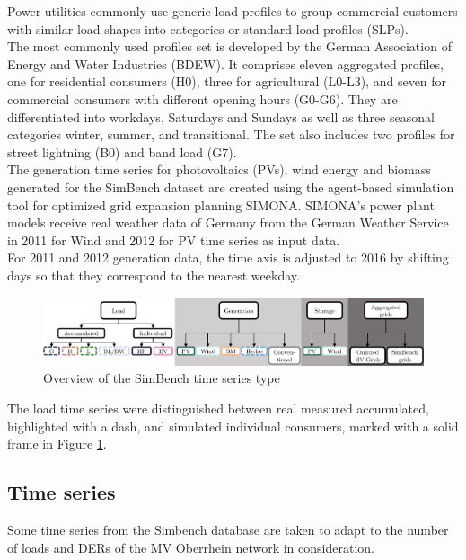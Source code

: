 Power utilities commonly use generic load profiles to group commercial customers with similar load shapes into categories or standard load profiles (\glspl{SLP}). \\
The most commonly used profiles set is developed by the German Association of Energy and Water Industries (\gls{BDEW}). It comprises eleven aggregated profiles, one for residential consumers (H0), three for agricultural (L0-L3), and seven for commercial consumers with different opening hours (G0-G6). They are differentiated into workdays, Saturdays and Sundays as well as three seasonal categories winter, summer, and transitional. The set also includes two profiles for street lightning (B0) and band load (G7). \\
The generation time series for photovoltaics (\glspl{PV}), wind energy and biomass generated for the SimBench dataset are created using the agent-based simulation tool for optimized grid expansion planning SIMONA. SIMONA's power plant models receive real weather data of Germany from the German Weather Service in 2011 for Wind and 2012 for \gls{PV} time series as input data. \\
For 2011 and 2012 generation data, the time axis is adjusted to 2016 by shifting days so that they correspond to the nearest weekday\cite{Simbenchds1}.\\

\begin{figure}[h]
\centering
    \includegraphics[width=.9\linewidth]{images/MVOberr/SimBench time series types.PNG}
\caption{Overview of the SimBench time series type}
\label{fig:SBtimeseriestype}
\end{figure}

The load time series were distinguished between real measured accumulated, highlighted with a dash, and simulated individual consumers, marked with a solid frame in Figure \ref{fig:SBtimeseriestype}. \\

\subsection{Time series}
\label{ts}
Some time series from the Simbench database are taken to adapt to the number of loads and \glspl{DER} of the MV Oberrhein network in consideration. \\

